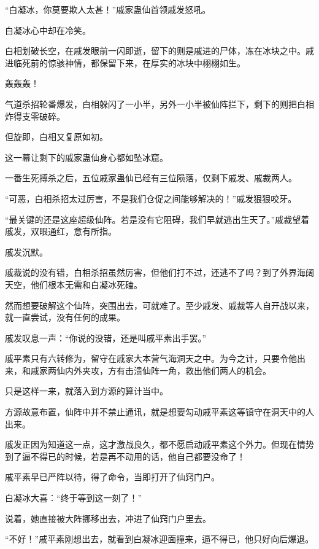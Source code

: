 
\begin{this_body}



“白凝冰，你莫要欺人太甚！”戚家蛊仙首领戚发怒吼。

白凝冰心中却在冷笑。

白相划破长空，在戚发眼前一闪即逝，留下的则是戚进的尸体，冻在冰块之中。戚进临死前的惊骇神情，都保留下来，在厚实的冰块中栩栩如生。

轰轰轰！

气道杀招轮番爆发，白相躲闪了一小半，另外一小半被仙阵拦下，剩下的则把白相炸得支零破碎。

但旋即，白相又复原如初。

这一幕让剩下的戚家蛊仙身心都如坠冰窟。

一番生死搏杀之后，五位戚家蛊仙已经有三位陨落，仅剩下戚发、戚裁两人。

“可恶，白相杀招太过厉害，不是我们仓促之间能够解决的！”戚发狠狠咬牙。

“最关键的还是这座超级仙阵。若是没有它阻碍，我们早就逃出生天了。”戚裁望着戚发，双眼通红，意有所指。

戚发沉默。

戚裁说的没有错，白相杀招虽然厉害，但他们打不过，还逃不了吗？到了外界海阔天空，他们根本无需和白凝冰死磕。

然而想要破解这个仙阵，突围出去，可就难了。至少戚发、戚裁等人自开战以来，就一直尝试，没有任何的成果。

戚发叹息一声：“你说的没错，还是叫戚平素出手罢。”

戚平素只有六转修为，留守在戚家大本营气海洞天之中。为今之计，只要令他出来，和戚家两仙内外夹攻，方有击溃仙阵一角，救出他们两人的机会。

只是这样一来，就落入到方源的算计当中。

方源故意布置，仙阵中并不禁止通讯，就是想要勾动戚平素这等镇守在洞天中的人出来。

戚发正因为知道这一点，这才激战良久，都不愿启动戚平素这个外力。但现在情势到了逼不得已的时候，若是再不动用的话，他自己都要没命了！

戚平素早已严阵以待，得了命令，当即打开了仙窍门户。

白凝冰大喜：“终于等到这一刻了！”

说着，她直接被大阵挪移出去，冲进了仙窍门户里去。

“不好！”戚平素刚想出去，就看到白凝冰迎面撞来，逼不得已，他只好向后爆退。


\end{this_body}
